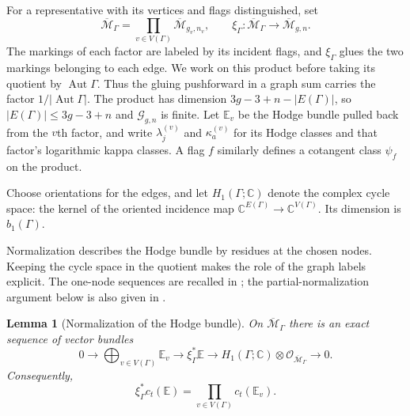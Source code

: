 \documentclass[a4paper,10pt]{article}
\numberwithin{equation}{section}
\newcommand{\MM}{\overline{\mathcal{M}}}
\newcommand{\EE}{\mathbb{E}}
\theoremstyle{paperplain}
\newtheorem{lmm}[thm]{Lemma}
\theoremstyle{paperremark}
\theoremstyle{paperplain}
\begin{document}
For a representative with its vertices and flags distinguished, set
\begin{equation}
\label{eq:s02:gluing-map}
\MM_\Gamma=\prod_{v\in V(\Gamma)}\MM_{g_v,n_v},
\qquad
\xi_\Gamma:\MM_\Gamma\longrightarrow\MM_{g,n}.
\end{equation}
The markings of each factor are labeled by its incident flags, and
$\xi_\Gamma$ glues the two markings belonging to each edge.  We work
on this product before taking its quotient by
$\operatorname{Aut}\Gamma$.  Thus the gluing pushforward in a graph
sum carries the factor $1/|\operatorname{Aut}\Gamma|$.  The product
has dimension $3g-3+n-|E(\Gamma)|$, so $|E(\Gamma)|\leq3g-3+n$
and $\mathcal G_{g,n}$ is finite.  Let $\EE_v$ be the Hodge bundle
pulled back from the $v$th factor, and write $\lambda_j^{(v)}$ and
$\kappa_a^{(v)}$ for its Hodge classes and that factor's logarithmic
kappa classes.  A flag $f$ similarly defines a cotangent class
$\psi_f$ on the product.

Choose orientations for the edges, and let $H_1(\Gamma;\mathbb C)$
denote the complex cycle space: the kernel of the oriented incidence
map $\mathbb C^{E(\Gamma)}\to\mathbb C^{V(\Gamma)}$.  Its dimension
is $b_1(\Gamma)$.

Normalization describes the Hodge bundle by residues at the chosen
nodes.  Keeping the cycle space in the quotient makes the role of the
graph labels explicit.  The one-node sequences are recalled in
\cite[\S 1.3, (17)--(18)]{FP00}; the partial-normalization argument
below is also given in \cite[proof of Proposition 4.4, (4.2)--(4.3)]{LX26b}.

\begin{lmm}[Normalization of the Hodge bundle]
\label{lmm:s02:hodge-normalization}
On $\MM_\Gamma$ there is an exact sequence of vector bundles
\begin{equation}
\label{eq:s02:hodge-normalization}
0\longrightarrow\bigoplus_{v\in V(\Gamma)}\EE_v
\longrightarrow\xi_\Gamma^*\EE
\longrightarrow H_1(\Gamma;\mathbb C)\otimes\mathcal O_{\MM_\Gamma}
\longrightarrow0.
\end{equation}
Consequently,
\begin{equation}
\label{eq:s02:hodge-factorization}
\xi_\Gamma^*c_t(\EE)
=\prod_{v\in V(\Gamma)}c_t(\EE_v).
\end{equation}
\end{lmm}
\end{document}
